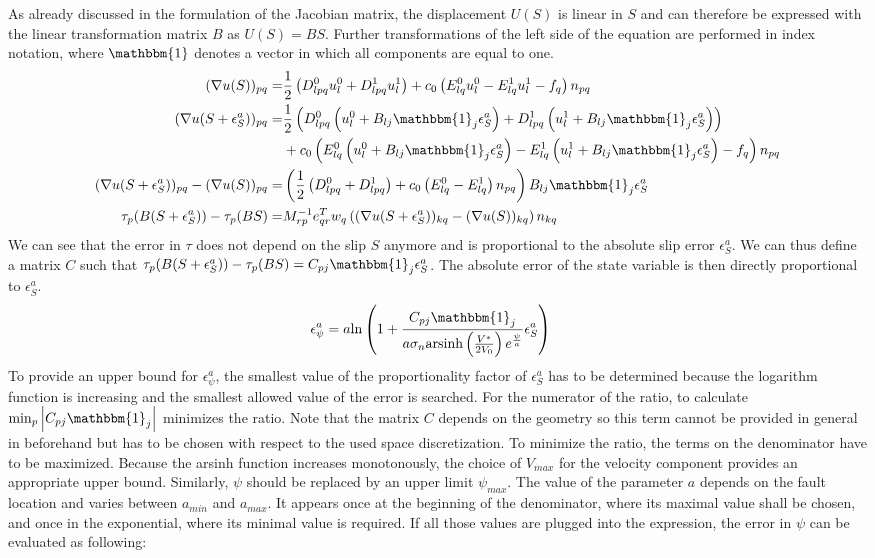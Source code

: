 \documentclass{report}
\begin{document}
As already discussed in the formulation of the Jacobian matrix, the displacement $U(S)$ is linear in $S$ and can therefore be expressed with the linear transformation matrix $B$ as $U(S) = BS$. Further transformations of the left side of the equation are performed in index notation, where $\mathbbm{1}$ denotes a vector in which all components are equal to one. 
\begin{align}
    (\nabla u(S))_{pq} =& \frac{1}{2}\left(D_{lpq}^0u_l^0 + D_{lpq}^1u_l^1\right) + c_0\left(E_{lq}^0u_l^0 - E_{lq}^1u_l^1 - f_q\right)n_{pq} \\ \nonumber
    (\nabla u(S + \epsilon_S^a))_{pq} =& \frac{1}{2}\left(D_{lpq}^0\left(u_l^0+ B_{lj}\mathbbm{1}_j\epsilon_S^a\right) + D_{lpq}^1\left(u_l^1+ B_{lj}\mathbbm{1}_j\epsilon_S^a\right)\right) \\ &+ c_0\left(E_{lq}^0\left(u_l^0+ B_{lj}\mathbbm{1}_j\epsilon_S^a\right) - E_{lq}^1\left(u_l^1+ B_{lj}\mathbbm{1}_j\epsilon_S^a\right) - f_q\right)n_{pq} \\
    (\nabla u(S + \epsilon_S^a))_{pq} - (\nabla u(S))_{pq} =& \left(\frac{1}{2}\left(D_{lpq}^0 + D_{lpq}^1\right) + c_0\left(E_{lq}^0 - E_{lq}^1\right)n_{pq}\right)B_{lj}\mathbbm{1}_j\epsilon_S^a \\
    \tau_p(B(S+\epsilon_S^a)) - \tau_p(BS) =& M_{rp}^{-1}e_{qr}^Tw_q\left((\nabla u(S + \epsilon_S^a))_{kq} - (\nabla u(S))_{kq}\right)n_{kq}
\end{align}
We can see that the error in $\tau$ does not depend on the slip $S$ anymore and is proportional to the absolute slip error $\epsilon_S^a$. We can thus define a matrix $C$ such that $\tau_p(B(S+\epsilon_S^a)) - \tau_p(BS) = C_{pj}\mathbbm{1}_j\epsilon_S^a$. The absolute error of the state variable is then directly proportional to $\epsilon_S^a$. 
\begin{align}
    \epsilon_\psi^a &= a\text{ln}\left(1+\frac{C_{pj}\mathbbm{1}_j}{a\sigma_n \text{arsinh}\left(\frac{V^*}{2V_0}\right)e^{\frac{\psi}{a}}}\epsilon_S^a\right) 
\end{align}
To provide an upper bound for $\epsilon_\psi^a$, the smallest value of the proportionality factor of $\epsilon_S^a$ has to be determined because the logarithm function is increasing and the smallest allowed value of the error is searched. For the numerator of the ratio, to calculate $\min_p\left|C_{pj}\mathbbm{1}_j\right|$ minimizes the ratio. Note that the matrix $C$ depends on the geometry so this term cannot be provided in general in beforehand but has to be chosen with respect to the used space discretization. To minimize the ratio, the terms on the denominator have to be maximized. Because the arsinh function increases monotonously, the choice of $V_{max}$ for the velocity component provides an appropriate upper bound. Similarly, $\psi$ should be replaced by an upper limit $\psi_{max}$. The value of the parameter $a$ depends on the fault location and varies between $a_{min}$ and $a_{max}$. It appears once at the beginning of the denominator, where its maximal value shall be chosen, and once in the exponential, where its minimal value is required. If all those values are plugged into the expression, the error in $\psi$ can be evaluated as following: 
\end{document}
